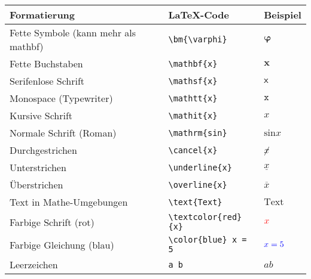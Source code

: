 \begin{table}[h]
    \centering
    \renewcommand{\arraystretch}{1.3}
    \begin{tabular}{lll}
        \toprule
        \textbf{Formatierung}                & \textbf{LaTeX-Code}                                 & \textbf{Beispiel}        \\
        \midrule
        Fette Symbole (kann mehr als mathbf) & \texttt{\textbackslash bm\{\textbackslash varphi\}} & \( \bm{\varphi} \)       \\
        Fette Buchstaben                     & \texttt{\textbackslash mathbf\{x\}}                 & \( \mathbf{x} \)         \\
        Serifenlose Schrift                  & \texttt{\textbackslash mathsf\{x\}}                 & \( \mathsf{x} \)         \\
        Monospace (Typewriter)               & \texttt{\textbackslash mathtt\{x\}}                 & \( \mathtt{x} \)         \\
        Kursive Schrift                      & \texttt{\textbackslash mathit\{x\}}                 & \( \mathit{x} \)         \\
        Normale Schrift (Roman)              & \texttt{\textbackslash mathrm\{sin\}}               & \( \mathrm{sin} x \)     \\
        \midrule
        Durchgestrichen                      & \texttt{\textbackslash cancel\{x\}}                 & \( \cancel{x} \)         \\
        Unterstrichen                        & \texttt{\textbackslash underline\{x\}}              & \( \underline{x} \)      \\
        Überstrichen                         & \texttt{\textbackslash overline\{x\}}               & \( \overline{x} \)       \\
        \midrule
        Text in Mathe-Umgebungen             & \texttt{\textbackslash text\{Text\}}                & \( \text{Text} \)        \\
        \midrule
        Farbige Schrift (rot)                & \texttt{\textbackslash textcolor\{red\}\{x\}}       & \( \textcolor{red}{x} \) \\
        Farbige Gleichung (blau)             & \texttt{\textbackslash color\{blue\} x = 5}         & \( \color{blue} x = 5 \) \\
        \midrule
        Leerzeichen                          & \texttt{a b}                                        & \( a  b \)               \\

\end{tabular}
\end{table}
